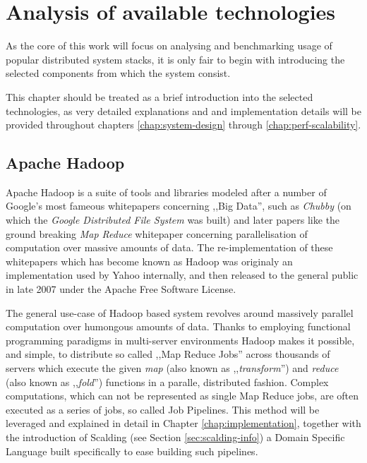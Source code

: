 \chapter{Analysis of available technologies}
As the core of this work will focus on analysing and benchmarking usage of popular distributed system stacks, it is only fair to begin with introducing the selected components from which the system consist.

This chapter should be treated as a brief introduction into the selected technologies, as very detailed explanations and and implementation details will be provided throughout chapters \ref{chap:system-design} through \ref{chap:perf-scalability}.

\section{Apache Hadoop}
\label{sec:hadoop}

Apache Hadoop is a suite of tools and libraries modeled after a number of Google's most fameous whitepapers concerning ,,Big Data'', such as \textit{Chubby} \cite{chubby} (on which the \textit{Google Distributed File System} \cite{gfs} was built) and later papers like the ground breaking \textit{Map Reduce} \cite{map-reduce} whitepaper concerning parallelisation of computation over massive amounts of data.
The re-implementation of these whitepapers which has become known as Hadoop was originaly an implementation used by Yahoo \cite{yahoo} internally, and then released to the general public in late 2007 under the Apache Free Software License.

The general use-case of Hadoop based system revolves around massively parallel computation over humongous amounts of data. Thanks to employing functional programming paradigms in multi-server environments Hadoop makes it possible, and simple, to distribute so called ,,Map Reduce Jobs'' across thousands of servers which execute the given \textit{map} (also known as ,,\textit{transform}'') and \textit{reduce} (also known as ,,\textit{fold}'') functions in a paralle, distributed fashion. Complex computations, which can not be represented as single Map Reduce jobs, are often executed as a series of jobs, so called Job Pipelines. This method will be leveraged and explained in detail in Chapter \ref{chap:implementation}, together with the introduction of Scalding (see Section \ref{sec:scalding-info}) a Domain Specific Language built specifically to ease building such pipelines.

